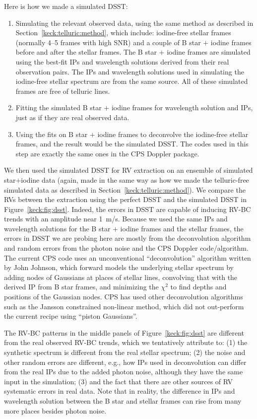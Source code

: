 Here is how we made a simulated DSST:
\begin{enumerate}
  \item Simulating the relevant observed data, using the same method
    as described in Section~\ref{keck:telluric:method}, which include:
    iodine-free stellar frames (normally 4--5 frames with high SNR) and a
    couple of B star $+$ iodine frames before and after the stellar
    frames. The B star $+$ iodine frames are simulated using the best-fit
    IPs and wavelength solutions derived from their real observation
    pairs. The IPs and wavelength solutions used in simulating the
    iodine-free stellar spectrum are from the same source. All of these
    simulated frames are free of telluric lines.
  \item Fitting the simulated B star $+$ iodine frames for wavelength
    solution and IPs, just as if they are real observed data.
  \item Using the fits on B star $+$ iodine frames to deconvolve the
    iodine-free stellar frames, and the result would be the simulated
    DSST. The codes used in this step are exactly the same ones in the
    CPS Doppler package.
\end{enumerate}

We then used the simulated DSST for RV extraction on an ensemble of
simulated star$+$iodine data (again, made in the same way as how we
made the telluric-free simulated data as described in
Section~\ref{keck:telluric:method}). We compare the RVs between the
extraction using the perfect DSST and the simulated DSST in
Figure~\ref{keck:fig:dsst}. Indeed, the errors in DSST are capable of
inducing RV-BC trends with an amplitude near 1~m/s. Because we used
the same IPs and wavelength solutions for the B star $+$ iodine frames
and the stellar frames, the errors in DSST we are probing here are
mostly from the deconvolution algorithm and random errors from the
photon noise and the CPS Doppler code/algorithm. The current CPS code
uses an unconventional ``deconvolution'' algorithm written by John
Johnson, which forward models the underlying stellar spectrum by
adding nodes of Gaussians at places of stellar lines, convolving that
with the derived IP from B star frames, and minimizing the $\chi^2$ to
find depths and positions of the Gaussian nodes. CPS has used other
deconvolution algorithms such as the Jansson constrained non-linear
method, which did not out-perform the current recipe using ``piston
Gaussians''.

The RV-BC patterns in the middle panels of Figure~\ref{keck:fig:dsst}
are different from the real observed RV-BC trends, which we
tentatively attribute to: (1) the synthetic spectrum is different from
the real stellar spectrum; (2) the noise and other random errors are
different, e.g., how IPs used in deconvolution can differ from the
real IPs due to the added photon noise, although they have the same
input in the simulation; (3) and the fact that there are other sources
of RV systematic errors in real data. Note that in reality, the
difference in IPs and wavelength solution between the B star and
stellar frames can rise from many more places besides photon noise.


